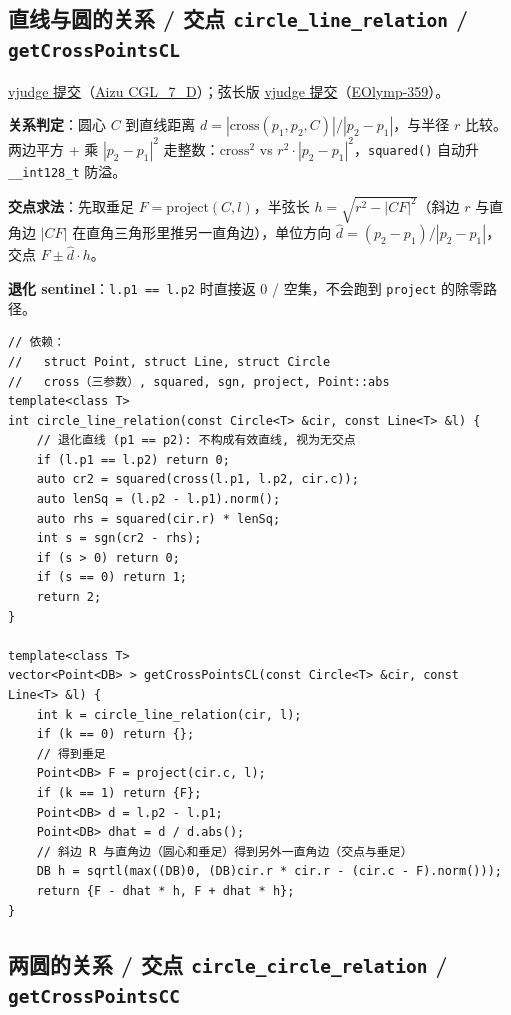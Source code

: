 		\subsection{直线与圆的关系 / 交点 \texttt{circle\_line\_relation} / \texttt{getCrossPointsCL}}

		\href{https://vjudge.net/solution/69928470}{vjudge 提交}（\href{https://vjudge.net/problem/Aizu-CGL_7_D}{Aizu CGL\_7\_D}）；弦长版 \href{https://vjudge.net/solution/69929454}{vjudge 提交}（\href{https://vjudge.net/problem/EOlymp-359}{EOlymp-359}）。

		\textbf{关系判定}：圆心 $C$ 到直线距离 $d = |\mathrm{cross}(p_1, p_2, C)| / |p_2 - p_1|$，与半径 $r$ 比较。两边平方 + 乘 $|p_2 - p_1|^2$ 走整数：$\mathrm{cross}^2$ vs $r^2 \cdot |p_2 - p_1|^2$，\texttt{squared()} 自动升 \texttt{\_\_int128\_t} 防溢。

		\textbf{交点求法}：先取垂足 $F = \mathrm{project}(C, l)$，半弦长 $h = \sqrt{r^2 - |CF|^2}$（斜边 $r$ 与直角边 $|CF|$ 在直角三角形里推另一直角边），单位方向 $\hat{d} = (p_2 - p_1) / |p_2 - p_1|$，交点 $F \pm \hat{d} \cdot h$。

		\textbf{退化 sentinel}：\texttt{l.p1 == l.p2} 时直接返 0 / 空集，不会跑到 \texttt{project} 的除零路径。

		\begin{verbatim}
// 依赖：
//   struct Point, struct Line, struct Circle
//   cross（三参数）, squared, sgn, project, Point::abs
template<class T>
int circle_line_relation(const Circle<T> &cir, const Line<T> &l) {
	// 退化直线 (p1 == p2): 不构成有效直线, 视为无交点
	if (l.p1 == l.p2) return 0;
	auto cr2 = squared(cross(l.p1, l.p2, cir.c));
	auto lenSq = (l.p2 - l.p1).norm();
	auto rhs = squared(cir.r) * lenSq;
	int s = sgn(cr2 - rhs);
	if (s > 0) return 0;
	if (s == 0) return 1;
	return 2;
}

template<class T>
vector<Point<DB> > getCrossPointsCL(const Circle<T> &cir, const Line<T> &l) {
	int k = circle_line_relation(cir, l);
	if (k == 0) return {};
	// 得到垂足
	Point<DB> F = project(cir.c, l);
	if (k == 1) return {F};
	Point<DB> d = l.p2 - l.p1;
	Point<DB> dhat = d / d.abs();
	// 斜边 R 与直角边（圆心和垂足）得到另外一直角边（交点与垂足）
	DB h = sqrtl(max((DB)0, (DB)cir.r * cir.r - (cir.c - F).norm()));
	return {F - dhat * h, F + dhat * h};
}
		\end{verbatim}

		\subsection{两圆的关系 / 交点 \texttt{circle\_circle\_relation} / \texttt{getCrossPointsCC}}

